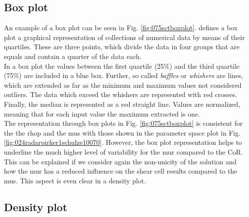 

\subsection{Box plot}
\label{subsec:boxplot}
  
An example of a box plot can be seen
in Fig. \ref{fig:075sctboxplot}.
\citet{RefWorks:207} defines a box plot a graphical representation of
collections of numerical data by means of their quartiles.
These are three points, which divide the data in four groups that are equals and
contain a quarter of the data each.\\
In a box plot the values between the first quartile (25\%) and the third
quartile (75\%) are included in a blue box.
Further, so called \textit{baffles} or \textit{whishers} are lines, which are
extended as far as the minimum and maximum values not considered outliers.
The data which exceed the whishers are represented with red crosses.
Finally, the median is represented as a red straight line.
Values are normalized, meaning that for each input value the maximum extracted
is one.\\
The representation through box plots in Fig.
\ref{fig:075sctboxplot} is consistent for the the \acs{rhop} and the
\acs{mus} with those shown in the parameter space plot in Fig.
\ref{fig:024radarpirker1schulze10070}.
However, the box plot representation helps to underline the much higher level of
variability for the \acs{mur} compared to the \acs{CoR}.
This can be explained if we consider again the non-unicity of the solution and
how the \acs{mur} has a reduced influence on the shear cell results compared to
the \acs{mus}.
This aspect is even clear in a density plot.



\subsection{Density plot}
\label{subsec:densityplot}

